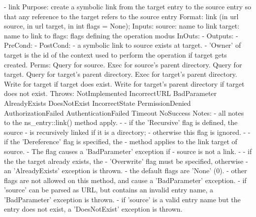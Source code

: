 \begin{myspec}
 
    - link
      Purpose:  create a symbolic link from the target entry to
                the source entry so that any reference to the
                target refers to the source entry
      Format:   link               (in  url        source,
                                    in  url        target,
                                    in  int     flags = None);
      Inputs:   source:             name to link
                target:             name to link to
                flags:              flags defining the operation
                                    modus
      InOuts:   -
      Outputs:  -
      PreCond:  -
      PostCond: - a symbolic link to source exists at target.
                - 'Owner' of target is the id of the context
                  used to perform the operation if target gets
                  created.
      Perms:    Query for source.
                Exec  for source's parent directory.
                Query for target.
                Query for target's parent directory.
                Exec  for target's parent directory.
                Write for target
                      if  target does exist.
                Write for target's parent directory 
                      if  target does not exist.
      Throws:   NotImplemented
                IncorrectURL
                BadParameter
                AlreadyExists
                DoesNotExist
                IncorrectState
                PermissionDenied
                AuthorizationFailed
                AuthenticationFailed
                Timeout
                NoSuccess
      Notes:    - all notes to the ns_entry::link() method
                  apply.
-               - if the 'Recursive' flag is defined, the source
-                 is recursively linked if it is a directory;
-                 otherwise this flag is ignored.
-               - if the 'Dereference' flag is specified, the
-                 method applies to the link target of source.
-                 The flag causes a 'BadParameter' exception if
-                 source is not a link.
-               - if the the target already exists, the 
-                 'Overwrite' flag must be specified, otherwise
-                 an 'AlreadyExists' exception is thrown.
                - the default flags are 'None' (0).
                - other flags are not allowed on this method, 
                  and cause a 'BadParameter' exception.
                - if 'source' can be parsed as URL, but contains 
                  an invalid entry name, a 'BadParameter'
                  exception is thrown.
                - if 'source' is a valid entry name but the entry
                  does not exist, a 'DoesNotExist' exception is
                  thrown.
 

\end{myspec}
